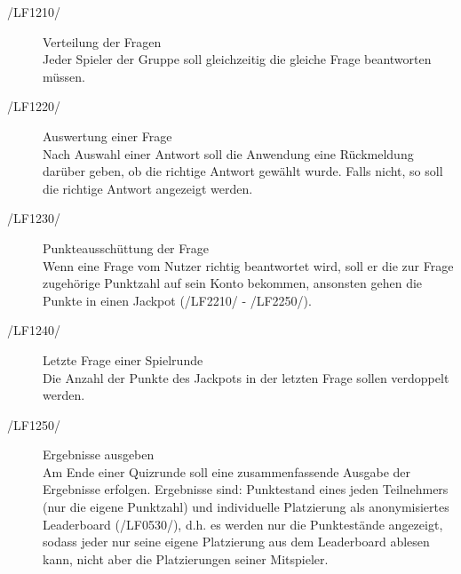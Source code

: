 \documentclass[11pt,a4paper]{scrreprt}
\begin{document}
\begin{description}
\item[/LF1210/]Verteilung der Fragen \\
Jeder Spieler der Gruppe soll gleichzeitig die gleiche Frage beantworten müssen.

\item[/LF1220/]Auswertung einer Frage \\ 
Nach Auswahl einer Antwort soll die Anwendung eine Rückmeldung darüber geben, ob die richtige Antwort gewählt wurde. Falls nicht, so soll die richtige Antwort angezeigt werden.
 
\item[/LF1230/]Punkteausschüttung der Frage \\
Wenn eine Frage vom Nutzer richtig beantwortet wird, soll er die zur Frage zugehörige Punktzahl auf sein Konto bekommen, ansonsten gehen die Punkte in einen Jackpot (/LF2210/ - /LF2250/).

\item[/LF1240/] Letzte Frage einer Spielrunde \\
Die Anzahl der Punkte des Jackpots in der letzten Frage sollen verdoppelt werden.

\item[/LF1250/] Ergebnisse ausgeben \\
Am Ende einer Quizrunde soll eine zusammenfassende Ausgabe der Ergebnisse erfolgen. Ergebnisse sind: Punktestand eines jeden Teilnehmers (nur die eigene Punktzahl) und  individuelle Platzierung als anonymisiertes Leaderboard (/LF0530/), d.h. es werden nur die Punktestände angezeigt, sodass jeder nur seine eigene Platzierung aus dem Leaderboard ablesen kann, nicht aber die Platzierungen seiner Mitspieler.
\end{description}
\end{document}
